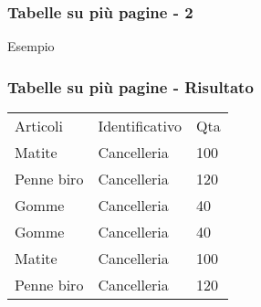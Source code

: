 \begin{frame}[fragile]
 
 \frametitle{Tabelle su più pagine - 2}
 
 \begin{exampleblock}{Esempio}
    
 \end{exampleblock}
\end{frame}
 
\begin{frame}
 
\frametitle{Tabelle su più pagine - Risultato}
\begin{center}
\begin{longtable}{lll} %
Articoli      & Identificativo & Qta \\
Matite        & Cancelleria    & 100 \\
Penne biro    & Cancelleria    & 120 \\
Gomme         & Cancelleria    & 40  \\
Gomme         & Cancelleria    & 40  \\
Matite        & Cancelleria    & 100 \\
Penne biro    & Cancelleria    & 120
\end{longtable}
\end{center}

\end{frame}
